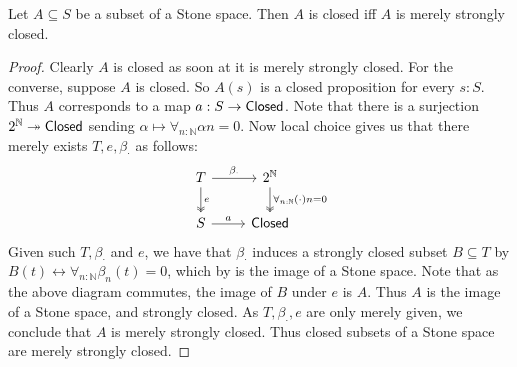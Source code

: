 \begin{corollary}
  Let $A\subseteq S$ be a subset of a Stone space. Then 
    $A$ is closed iff 
    $A$ is merely strongly closed. 
\end{corollary}
\begin{proof}
  Clearly $A$ is closed as soon at it is merely strongly closed. 
  For the converse, suppose $A$ is closed. 
  So $A(s)$ is a closed proposition for every $s:S$. 
  Thus $A$ corresponds to a map $a:S\to \mathsf{Closed}$. 
%
  Note that there is a surjection $2^\mathbb N \twoheadrightarrow \mathsf{Closed}$ sending 
  $\alpha \mapsto \forall_{n:\mathbb N} \alpha n = 0. $
  Now local choice gives us that there merely exists $T, e, \beta_\cdot$ as follows:
  \begin{equation}
    \begin{tikzcd}
      T \arrow[r,"\beta_\cdot"] \arrow[d, two heads,"e"] & 2^\mathbb N 
      \arrow[d,two heads, "\forall_{n:\mathbb N} (\cdot)n = 0"] \\
      S \arrow[r,"a"] & \Closed
    \end{tikzcd} 
  \end{equation} 
  Given such $T,\beta_\cdot $ and $e$, we have that 
  $\beta_\cdot$ induces a strongly closed subset $B\subseteq T$ by 
  $B(t) \leftrightarrow \forall_{n:\mathbb N} \beta_n(t) = 0$, which by 
   is the image of a Stone space. 
  Note that as the above diagram commutes, the image of $B$ under $e$ is $A$.
  Thus $A$ is the image of a Stone space, and strongly closed. 
  As $T,\beta_\cdot, e$ are only merely given, we conclude that $A$ is merely strongly closed. 
  Thus closed subsets of a Stone space are merely strongly closed. 
\end{proof}



